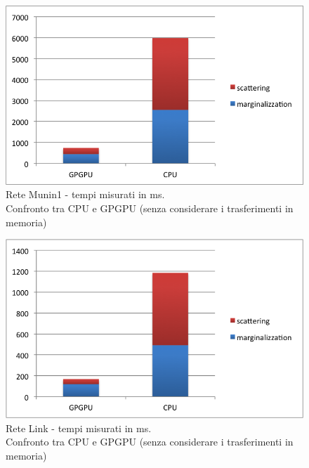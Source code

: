 \documentclass[a4paper]{article}   %
\begin{document}
\begin{figure}[p]
\centering
\includegraphics[scale=0.8]{Munin1.png}
\caption{Rete Munin1 - tempi misurati in ms.\\Confronto tra CPU e GPGPU (senza considerare i trasferimenti in memoria)} 
\label{graficoMunin1}
\end{figure}

\begin{figure}[p]
\centering
\includegraphics[scale=0.8]{Link.png}
\caption{Rete Link - tempi misurati in ms.\\Confronto tra CPU e GPGPU (senza considerare i trasferimenti in memoria)} 
\label{graficoLink}
\end{figure}


\end{document}
